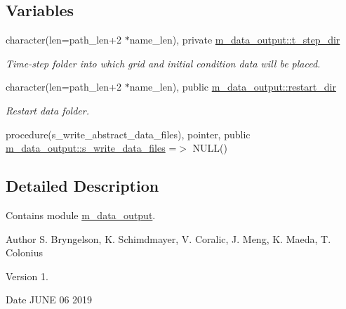 \subsection*{Variables}
\begin{DoxyCompactItemize}
\item 
character(len=path\+\_\+len+2 $\ast$name\+\_\+len), private \hyperlink{namespacem__data__output_aba17ac5a2fbc723664abf5c17e07c4e8}{m\+\_\+data\+\_\+output\+::t\+\_\+step\+\_\+dir}
\begin{DoxyCompactList}\small\item\em Time-\/step folder into which grid and initial condition data will be placed. \end{DoxyCompactList}\item 
character(len=path\+\_\+len+2 $\ast$name\+\_\+len), public \hyperlink{namespacem__data__output_aa2b7bc17089e38b53927e6b77b61b6c7}{m\+\_\+data\+\_\+output\+::restart\+\_\+dir}
\begin{DoxyCompactList}\small\item\em Restart data folder. \end{DoxyCompactList}\item 
procedure(s\+\_\+write\+\_\+abstract\+\_\+data\+\_\+files), pointer, public \hyperlink{namespacem__data__output_a1ba4e8126b198fb2147d4d9b60f74e44}{m\+\_\+data\+\_\+output\+::s\+\_\+write\+\_\+data\+\_\+files} =$>$ N\+U\+LL()
\end{DoxyCompactItemize}


\subsection{Detailed Description}
Contains module \hyperlink{namespacem__data__output}{m\+\_\+data\+\_\+output}. 

\begin{DoxyAuthor}{Author}
S. Bryngelson, K. Schimdmayer, V. Coralic, J. Meng, K. Maeda, T. Colonius 
\end{DoxyAuthor}
\begin{DoxyVersion}{Version}
1. 
\end{DoxyVersion}
\begin{DoxyDate}{Date}
J\+U\+NE 06 2019 
\end{DoxyDate}
